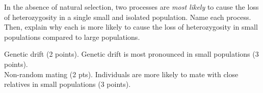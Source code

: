 \question[10]
In the absence of natural selection, two processes are \emph{most likely} to cause the loss of heterozygosity in a single small and isolated population. Name each process.  Then, explain why each is more likely to cause the loss of heterozygosity in small populations compared to large populations.


\begin{solution}
Genetic drift (2 points). Genetic drift is most pronounced in small populations (3 points). \\
Non-random mating (2 pts).  Individuals are more likely to mate with close relatives in small populations (3 points).
\end{solution}
